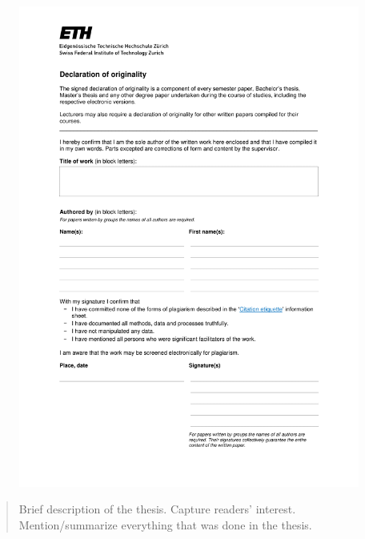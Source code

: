 \documentclass[
11pt, %
english, %
singlespacing, %
headsepline, %
]{MastersDoctoralThesis} %
\begin{document}

\begin{figure}[t]
  \centering
  \includegraphics[width=\textwidth]{Figures/declaration-originality.pdf}
\end{figure}


\begin{abstract}
\addchaptertocentry{\abstractname} %
Brief description of the thesis. Capture readers' interest. Mention/summarize everything that was done in the thesis.
\end{abstract}
\end{document}
